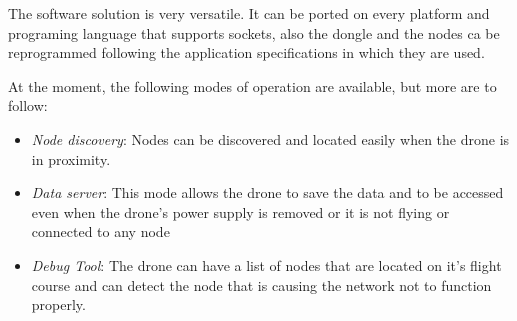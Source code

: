 The software solution is very versatile. It can be ported on every platform and 
programing language that supports sockets, also the dongle and the nodes ca be
reprogrammed following the application specifications in which they are used.
 
At the moment, the following modes of operation are available, but more are to follow:

\begin{itemize}

\item \textit{Node discovery}: Nodes can be discovered and located easily when the drone
is in proximity.

\item \textit{Data server}: This mode allows the drone to save the data and to
be accessed even when the drone's power supply is removed or it is not flying 
or connected to any node 

\item \textit{Debug Tool}: The drone can have a list of nodes that are located on it's flight 
course and can detect the node that is causing the network not to function properly.

 \end{itemize}

 

